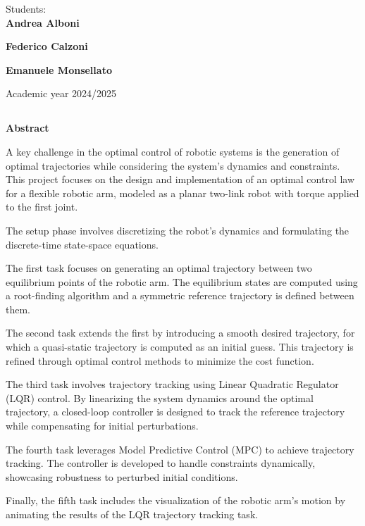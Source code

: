 \begin{flushright}
      {\large Students:}\\
        \vspace{0.3 cm}
        \large{{\textbf{Andrea Alboni}}}

        \vspace{0.1 cm}
        {\large{{\textbf{Federico Calzoni}}}}

        \vspace{0.1 cm}
        {\large{{\textbf{Emanuele Monsellato}}}}
\end{flushright}        %
\begin{center}
\vfill
      {\large Academic year \@2024/2025} \\
\end{center}


\newpage
\thispagestyle{empty}

\begin{center}
\chapter*{}
\thispagestyle{empty}
{\Huge \textbf{Abstract}}\\
\vspace{15mm}
\end{center}

A key challenge in the optimal control of robotic systems is the generation of optimal trajectories while considering the system's dynamics and constraints. This project focuses on the design and implementation of an optimal control law for a flexible robotic arm, modeled as a planar two-link robot with torque applied to the first joint. 

The setup phase involves discretizing the robot's dynamics and formulating the discrete-time state-space equations.

The first task focuses on generating an optimal trajectory between two equilibrium points of the robotic arm. The equilibrium states are computed using a root-finding algorithm and a symmetric reference trajectory is defined between them. 

The second task extends the first by introducing a smooth desired trajectory, for which a quasi-static trajectory is computed as an initial guess. This trajectory is refined through optimal control methods to minimize the cost function.

The third task involves trajectory tracking using Linear Quadratic Regulator (LQR) control. By linearizing the system dynamics around the optimal trajectory, a closed-loop controller is designed to track the reference trajectory while compensating for initial perturbations.

The fourth task leverages Model Predictive Control (MPC) to achieve trajectory tracking. The controller is developed to handle constraints dynamically, showcasing robustness to perturbed initial conditions.

Finally, the fifth task includes the visualization of the robotic arm's motion by animating the results of the LQR trajectory tracking task.